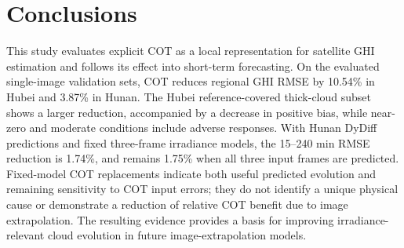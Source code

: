\documentclass[11pt]{article}
\begin{document}
\section{Conclusions}
This study evaluates explicit COT as a local representation for satellite GHI estimation and follows its effect into short-term forecasting. On the evaluated single-image validation sets, COT reduces regional GHI RMSE by 10.54\% in Hubei and 3.87\% in Hunan. The Hubei reference-covered thick-cloud subset shows a larger reduction, accompanied by a decrease in positive bias, while near-zero and moderate conditions include adverse responses. With Hunan DyDiff predictions and fixed three-frame irradiance models, the 15--240 min RMSE reduction is 1.74\%, and remains 1.75\% when all three input frames are predicted. Fixed-model COT replacements indicate both useful predicted evolution and remaining sensitivity to COT input errors; they do not identify a unique physical cause or demonstrate a reduction of relative COT benefit due to image extrapolation. The resulting evidence provides a basis for improving irradiance-relevant cloud evolution in future image-extrapolation models.
\FloatBarrier
\end{document}
